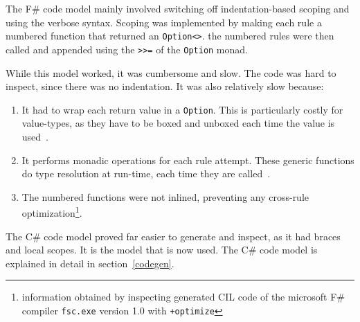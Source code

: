 The F\# code model mainly involved switching off indentation-based scoping and using the verbose syntax.
Scoping was implemented by making each rule a numbered function that returned an \verb|Option<>|.
the numbered rules were then called and appended using the \verb|>>=| of the \verb|Option| monad.

While this model worked, it was cumbersome and slow.
The code was hard to inspect, since there was no indentation.
It was also relatively slow because:

\begin{enumerate}
\item It had to wrap each return value in a \verb|Option|. 
    This is particularly costly for value-types, as they have to be boxed and unboxed each time the value is used~\cite{cisternino}.
\item It performs monadic operations for each rule attempt.
    These generic functions do type resolution at run-time, each time they are called~\cite{cisternino}.
\item The numbered functions were not inlined, preventing any cross-rule optimization\footnote{information obtained by inspecting generated CIL code of the microsoft F\# compiler \texttt{fsc.exe} version 1.0 with \texttt{+optimize}}.
\end{enumerate}

The C\# code model proved far easier to generate and inspect, as it had braces and local scopes.
It is the model that is now used. The C\# code model is explained in detail in section~\ref{codegen}.
